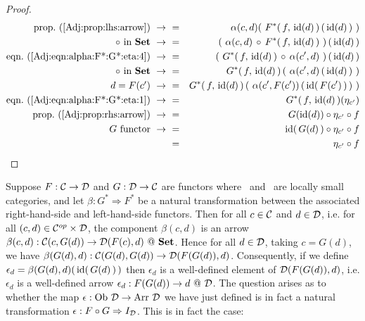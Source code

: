 \begin{proof}
\begin{eqnarray*}
            \mbox{prop.~(\ref{Adj:prop:lhs:arrow})}\ \to\ 
            &=&\alpha(c,d)(\ F^{*}(\,f,\,\id(d)\,)\,(\,\id(d)\,)\ )\\
            \mbox{$\circ$ in \Set}\ \to\ 
            &=&(\ \alpha(c,d)\,\circ\,F^{*}(\,f,\,\id(d)\,)\ )\,(\,\id(d)\,)\\
            \mbox{eqn.~(\ref{Adj:eqn:alpha:F*:G*:eta:4})}\ \to\ 
            &=&(\ G^{*}(\,f,\,\id(d)\,)\,\circ\,\alpha(c',d)\ )\,(\,\id(d)\,)\\
            \mbox{$\circ$ in \Set}\ \to\ 
            &=&G^{*}(\,f,\,\id(d)\,)\,(\ \alpha(c',d)\,(\,\id(d)\,)\ )\\
            \mbox{$d=F(c')$}\ \to\ 
            &=&G^{*}(\,f,\,\id(d)\,)\,(\ \alpha(c',F(c'))\,(\,\id(\,F(c')\,)\,)\ )\\
            \mbox{eqn.~(\ref{Adj:eqn:alpha:F*:G*:eta:1})}\ \to\ 
            &=&G^{*}(\,f,\,\id(d)\,)(\eta_{c'})\\
            \mbox{prop.~(\ref{Adj:prop:rhs:arrow})}\ \to\ 
            &=&G(\id(d))\circ\eta_{c'}\circ f\\
            \mbox{$G$ functor}\ \to\ 
            &=&\id(\,G(d)\,)\circ\eta_{c'}\circ f\\
            &=&\eta_{c'}\circ f\\
        \end{eqnarray*}
\end{proof}

Suppose $F:\mbox{$\cal C$}\to\mbox{$\cal D$}$ and $G:\mbox{$\cal D$}\to\mbox{$\cal C$}$ are functors where \Cat\ and \Dat\ 
are locally small categories, and let $\beta:G^{*}\Rightarrow F^{*}$ be a 
natural transformation between the associated right-hand-side and left-hand-side
functors. Then for all $c\in\mbox{$\cal C$}$ and $d\in\mbox{$\cal D$}$, i.e. for all $(c,d)\in
\mbox{${\cal C}^{op}$}\times\mbox{$\cal D$}$, the component $\beta(c,d)$ is an arrow
$\beta(c,d):\Cat(c,G(d))\to\Dat(F(c),d)\ @\ \Set$. Hence for all $d\in\mbox{$\cal D$}$,
taking $c=G(d)$, we have $\beta(G(d),d):\mbox{$\cal C$}(G(d),G(d))\to\mbox{$\cal D$}(F(G(d)),d)$.
Consequently, if we define $\epsilon_{d}=\beta(G(d),d)(\,\mbox{\rm id}(\,G(d)\,)\,)$ then
$\epsilon_{d}$ is a well-defined element of $\mbox{$\cal D$}(F(G(d)),d)$, i.e.
$\epsilon_{d}$ is a well-defined arrow $\epsilon_{d}:F(G(d))\to d\ @\ \mbox{$\cal D$}$. The question
arises as to whether the map $\epsilon:\mbox{\rm Ob}\ \mbox{$\cal D$}\to\mbox{\rm Arr}\ \mbox{$\cal D$}$ we have just defined
is in fact a natural transformation $\epsilon:F\circ G\Rightarrow I_{\cal D}$.
This is in fact the case:

